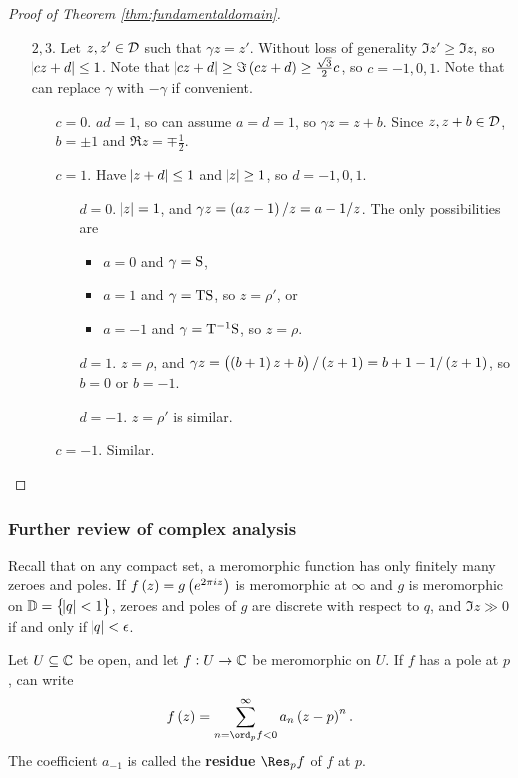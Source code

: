 \begin{proof}[Proof of Theorem \ref{thm:fundamentaldomain}]
\begin{enumerate}
\item[$ 2, 3 $.] Let $ z, z' \in \DDD $ such that $ \gamma z = z' $. Without loss of generality $ \Im z' \ge \Im z $, so $ \abs{cz + d} \le 1 $. Note that $ \abs{cz + d} \ge \Im \br{cz + d} \ge \tfrac{\sqrt{3}}{2}c $, so $ c = -1, 0, 1 $. Note that can replace $ \gamma $ with $ -\gamma $ if convenient.
\begin{itemize}
\item[$ c = 0 $.] $ ad = 1 $, so can assume $ a = d = 1 $, so $ \gamma z = z + b $.
Since $ z, z + b \in \DDD $, $ b = \pm 1 $ and $ \Re z = \mp\tfrac{1}{2} $.
\item[$ c = 1 $.] Have $ \abs{z + d} \le 1 $ and $ \abs{z} \ge 1 $, so $ d = -1, 0, 1 $.
\begin{itemize}
\item[$ d = 0 $.] $ \abs{z} = 1 $, and $ \gamma z = \br{az - 1} / z = a - 1 / z $.
The only possibilities are
\begin{itemize}
\item $ a = 0 $ and $ \gamma = \S $,
\item $ a = 1 $ and $ \gamma = \T\S $, so $ z = \rho' $, or
\item $ a = -1 $ and $ \gamma = \T^{-1}\S $, so $ z = \rho $.
\end{itemize}
\item[$ d = 1 $.] $ z = \rho $, and $ \gamma z = \br{\br{b + 1}z + b} / \br{z + 1} = b + 1 - 1 / \br{z + 1} $, so $ b = 0 $ or $ b = -1 $.
\item[$ d = -1 $.] $ z = \rho' $ is similar.
\end{itemize}
\item[$ c = -1 $.] Similar.
\end{itemize}
\end{enumerate}
\end{proof}

\subsubsection{Further review of complex analysis}

Recall that on any compact set, a meromorphic function has only finitely many zeroes and poles. If $ f\br{z} = g\br{e^{2\pi i z}} $ is meromorphic at $ \infty $ and $ g $ is meromorphic on $ \DD = \cbr{\abs{q} < 1} $, zeroes and poles of $ g $ are discrete with respect to $ q $, and $ \Im z \gg 0 $ if and only if $ \abs{q} < \epsilon $.

\begin{definition}
Let $ U \subseteq \CC $ be open, and let $ f : U \to \CC $ be meromorphic on $ U $. If $ f $ has a pole at $ p $, can write
$$ f\br{z} = \sum_{n = \ord_p f < 0}^\infty a_n\br{z - p}^n. $$
The coefficient $ a_{-1} $ is called the \textbf{residue} $ \Res_p f $ of $ f $ at $ p $.
\end{definition}

